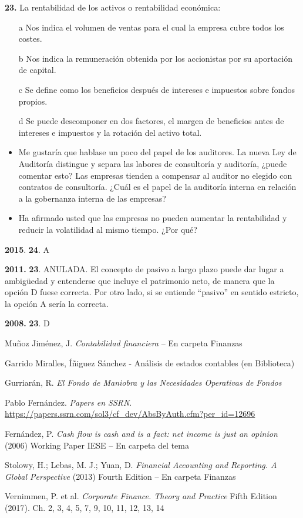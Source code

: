 \documentclass{nuevotema}
\begin{document}
\textbf{23.} La rentabilidad de los activos o rentabilidad económica:

\begin{enumerate}
	\item[a] Nos indica el volumen de ventas para el cual la empresa cubre todos los costes.
	\item[b] Nos indica la remuneración obtenida por los accionistas por su aportación de capital.
	\item[c] Se define como los beneficios después de intereses e impuestos sobre fondos propios.
	\item[d] Se puede descomponer en dos factores, el margen de beneficios antes de intereses e impuestos y la rotación del activo total.
\end{enumerate}


\begin{itemize}
    \item Me gustaría que hablase un poco del papel de los auditores. La nueva Ley de Auditoría distingue y separa las labores de consultoría y auditoría, ¿puede comentar esto? Las empresas tienden a compensar al auditor no elegido con contratos de consultoría. ¿Cuál es el papel de la auditoría interna en relación a la gobernanza interna de las empresas?
    \item Ha afirmado usted que las empresas no pueden aumentar la rentabilidad y reducir la volatilidad al mismo tiempo. ¿Por qué?
\end{itemize}

\notas

\textbf{2015}. \textbf{24}. A

\textbf{2011.} \textbf{23}. ANULADA. El concepto de pasivo a largo plazo puede dar lugar a ambigüedad y entenderse que incluye el patrimonio neto, de manera que la opción D fuese correcta. Por otro lado, si se entiende ``pasivo'' en sentido estricto, la opción A sería la correcta.

\textbf{2008.} \textbf{23}. D

\bibliografia

Muñoz Jiménez, J. \textit{Contabilidad financiera} -- En carpeta Finanzas

Garrido Miralles, Íñiguez Sánchez - Análisis de estados contables (en Biblioteca)

Gurriarán, R. \textit{El Fondo de Maniobra y las Necesidades Operativas de Fondos} 

Pablo Fernández. \textit{Papers en SSRN}. \url{https://papers.ssrn.com/sol3/cf_dev/AbsByAuth.cfm?per_id=12696}

Fernández, P. \textit{Cash flow is cash and is a fact: net income is just an opinion} (2006) Working Paper IESE -- En carpeta del tema

Stolowy, H.; Lebas, M. J.; Yuan, D. \textit{Financial Accounting and Reporting. A Global Perspective} (2013) Fourth Edition -- En carpeta Finanzas

Vernimmen, P. et al. \textit{Corporate Finance. Theory and Practice} Fifth Edition (2017). Ch. 2, 3, 4, 5, 7, 9, 10, 11, 12, 13, 14
\end{document}
